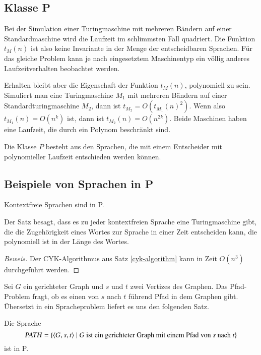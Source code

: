 \subsection{Klasse P}
Bei der Simulation einer Turingmaschine mit mehreren Bändern
auf einer Standardmaschine wird die Laufzeit im schlimmsten
Fall quadriert. Die Funktion $t_M(n)$ ist also keine Invariante
in der Menge der entscheidbaren Sprachen. Für das gleiche Problem kann
je nach eingesetztem Maschinentyp ein völlig anderes Laufzeitverhalten
beobachtet werden. 

Erhalten bleibt aber die Eigenschaft der Funktion $t_M(n)$, 
polynomiell zu sein. Simuliert man eine Turingmaschine $M_1$ mit
mehreren Bändern auf einer Standardturingmaschine $M_2$,
dann ist $t_{M_2}=O(t_{M_1}(n)^2)$.
Wenn also $t_{M_1}(n)=O(n^k)$ ist, dann ist $t_{M_2}(n)=O(n^{2k}).$
Beide Maschinen haben eine Laufzeit, die durch ein Polynom beschränkt
sind.

\begin{definition}
Die Klasse $P$ besteht aus den Sprachen, die mit einem Entscheider
mit polynomieller Laufzeit entschieden werden können.
\end{definition}

\subsection{Beispiele von Sprachen in P}
\begin{satz}
Kontextfreie Sprachen sind in P.
\end{satz}

Der Satz besagt, dass es zu jeder kontextfreien Sprache eine
Turingmaschine gibt, die die Zugehörigkeit eines Wortes zur
Sprache in einer Zeit entscheiden kann, die polynomiell ist in
der Länge des Wortes.

\begin{proof}[Beweis]
Der CYK-Algorithmus aus Satz \ref{cyk-algorithm}
kann in Zeit $O(n^3)$ durchgeführt werden.
\end{proof}

Sei $G$ ein gerichteter Graph und $s$ und $t$ zwei Vertizes
des Graphen. Das Pfad-Problem fragt, ob es einen von $s$ nach $t$
führend Pfad in dem Graphen gibt. Übersetzt in ein Spracheproblem
liefert es uns den folgenden Satz.

\begin{satz}
Die Sprache
\[
\text{\textsl{PATH}}
=\{
\langle G,s,t\rangle
\;|\;\text{$G$ ist ein gerichteter Graph mit einem Pfad von $s$ nach $t$}
\}
\]
ist in P.
\end{satz}

